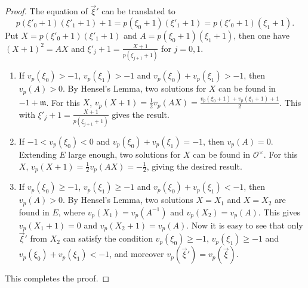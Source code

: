\documentclass[11pt]{amsart}
\theoremstyle{definition}
\numberwithin{equation}{subsection}
\theoremstyle{plain}
\theoremstyle{plain}
\theoremstyle{plain}
\theoremstyle{plain}
\theoremstyle{plain}
\theoremstyle{plain}
\theoremstyle{plain}
\theoremstyle{plain}
\theoremstyle{plain}
\theoremstyle{plain}
\theoremstyle{plain}
\theoremstyle{plain}
\theoremstyle{definition}
\theoremstyle{definition}
\theoremstyle{definition}
\theoremstyle{remark}
\renewcommand{\(}{\textup{(}}
\renewcommand{\)}{\textup{)}}
\newcommand{\fm}{\mathfrak{m}}
\newcommand{\cO}{\mathcal{O}}
\begin{document}
\begin{proof}
The equation of $\vec{\xi}'$ can be translated to
$$p(\xi'_0+1)(\xi'_1+1)+1=p(\xi_0+1)(\xi'_1+1)=p(\xi'_0+1)(\xi_1+1).$$
Put $X=p(\xi'_0+1)(\xi'_1+1)$ and $A=p(\xi_0+1)(\xi_1+1)$, then one have $(X+1)^2=AX$ and $\xi'_j+1=\frac{X+1}{p(\xi_{j+1}+1)}$ for $j=0,1$.
\begin{enumerate}[leftmargin=*]
\item If $v_p(\xi_0)>-1$, $v_p(\xi_1)>-1$ and $v_p(\xi_0)+v_p(\xi_1)>-1$, then $v_p(A)>0$. By Hensel's Lemma, two solutions for $X$ can be found in $-1+\fm$. For this $X$, $v_p(X+1)=\frac{1}{2}v_p(AX)=\frac{v_p(\xi_0+1)+v_p(\xi_1+1)+1}{2}$. This with $\xi'_j+1=\frac{X+1}{p(\xi_{j+1}+1)}$ gives the result.
\item If $-1<v_p(\xi_0)<0$ and $v_p(\xi_0)+v_p(\xi_1)=-1$, then $v_p(A)=0$. Extending $E$ large enough, two solutions for $X$ can be found in $\cO^\times$. For this $X$, $v_p(X+1)=\frac{1}{2}v_p(AX)=-\frac{1}{2}$, giving the desired result.
\item If $v_p(\xi_0)\geq -1$, $v_p(\xi_1)\geq -1$ and $v_p(\xi_0)+v_p(\xi_1)<-1$, then $v_p(A)>0$. By Hensel's Lemma, two solutions $X=X_1$ and $X=X_2$ are found in $E$, where $v_p(X_1)=v_p(A^{-1})$ and $v_p(X_2)=v_p(A)$. This gives $v_p(X_1+1)=0$ and $v_p(X_2+1)=v_p(A)$. Now it is easy to see that only $\vec{\xi}'$ from $X_2$ can satisfy the condition $v_p(\xi_0)\geq -1$, $v_p(\xi_1)\geq -1$ and $v_p(\xi_0)+v_p(\xi_1)<-1$, and moreover $v_p(\vec{\xi}')=v_p(\vec{\xi})$.
\end{enumerate}
This completes the proof.
\end{proof}
\end{document}
